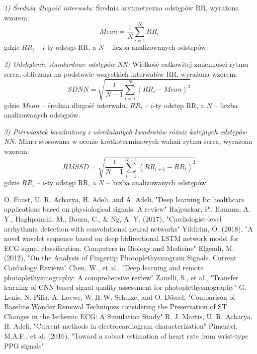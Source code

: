 \documentclass[journal]{IEEEtran}
\begin{document}
\noindent\textit{1) Średnia długość interwału:} 
Średnia arytmetyczna odstępów RR, wyrażona wzorem:
\begin{equation}
    Mean = \frac{1}{N} \sum_{i=1}^{N} RR_i
\end{equation}
gdzie $RR_i$ -- $i$-ty odstęp RR, a $N$ – liczba analizowanych odstępów.

\noindent\textit{2) Odchylenie standardowe odstępów NN:} 
Wielkość całkowitej zmienności rytmu serca, obliczana na podstawie wszystkich interwałów RR, wyrażona wzorem:
\begin{equation}
    SDNN = \sqrt{\frac{1}{N-1} \sum_{i=1}^{N} (RR_i - Mean)^2}
\end{equation}
gdzie $Mean$ – średnia długość interwału, $RR_i$ – $i$-ty odstęp RR, a $N$ – liczba analizowanych odstępów. \textbf{}

\noindent\textit{3) Pierwiastek kwadratowy z uśrednionych kwadratów różnic kolejnych odstępów NN:} 
Miara stosowana w ocenie krótkoterminowych wahań rytmu serca, wyrażona wzorem:
\begin{equation}
    RMSSD = \sqrt{\frac{1}{N-1} \sum_{i=1}^{N-1} (RR_{i+1} - RR_i)^2}
\end{equation}
gdzie $RR_i$ -- $i$-ty odstęp RR, a $N$ – liczba analizowanych odstępów.


 
\newpage
\begin{thebibliography}{1}
 O. Faust, U. R. Acharya, H. Adeli, and A. Adeli, "Deep learning for healthcare applications based on physiological signals: A review"
 Rajpurkar, P., Hannun, A. Y., Haghpanahi, M., Bourn, C., \& Ng, A. Y. (2017), "Cardiologist-level arrhythmia detection with convolutional neural networks"
 Yildirim, O. (2018), "A novel wavelet sequence based on deep bidirectional LSTM network model for ECG signal classification. Computers in Biology and Medicine"
 Elgendi, M. (2012), "On the Analysis of Fingertip Photoplethysmogram Signals. Current Cardiology Reviews"
Chen, W., et al., "Deep learning and remote photoplethysmography: A comprehensive review" 
Zanelli, S., et al., "Transfer learning of CNN-based signal quality assessment for photoplethysmography"
 G. Lenis, N. Pilia, A. Loewe, W. H. W. Schulze, and O. Dössel, "Comparison of Baseline Wander Removal Techniques considering the Preservation of ST Changes in the Ischemic ECG: A Simulation Study"
 R. J. Martis, U. R. Acharya, H. Adeli, "Current methods in electrocardiogram characterization"
 Pimentel, M.A.F., et al. (2016), "Toward a robust estimation of heart rate from wrist-type PPG signals"

\end{thebibliography}
\end{document}
